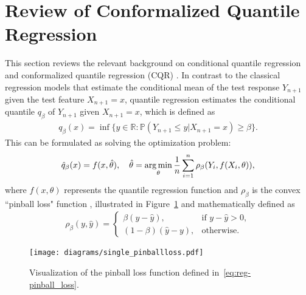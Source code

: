 \section{Review of Conformalized Quantile Regression}
\label{app:cqr_review}

This section reviews the relevant background on conditional quantile regression \cite{koenker1978quantreg} and conformalized quantile regression (CQR) \cite{romano2019conformalized}. 
In contrast to the classical regression models that estimate the conditional mean of the test response $Y_{n+1}$ given the test feature $X_{n+1} = x$, quantile regression estimates the conditional quantile $q_\beta$ of $Y_{n+1}$ given $X_{n+1} = x$, which is defined as
\begin{align} \label{eq:reg-cond_quantile}
    q_\beta(x) = \inf\{ y\in \mathbb{R}: \mathbb{P}(Y_{n+1} \leq y |X_{n+1} = x) \geq \beta \}.
\end{align}
This can be formulated as solving the optimization problem: 
\begin{align} \label{eq:reg-quantile_reg}
    \hat{q}_\beta(x) = f(x,\hat{\theta}), \quad \hat{\theta} = \operatorname*{arg\,min}_{\theta}\frac{1}{n}\sum_{i=1}^n \rho_\beta(Y_i, f(X_i, \theta)),
\end{align}
where $f(x,\theta)$ represents the quantile regression function \cite{koenker1978quantreg} and $\rho_\beta$ is the convex ``pinball loss" function \cite{Steinwart2011pinball}, illustrated in Figure~\ref{fig:pinball_loss} and mathematically defined as
\begin{align} \label{eq:reg-pinball_loss}
    \rho_\beta(y, \hat{y}) = 
  \begin{cases}\beta(y - \hat{y}), & \text{if } y - \hat{y} >0, \\
    (1-\beta)(\hat{y} - y), & \text{otherwise}.
    \end{cases}
\end{align}

\begin{figure}[!htb]
    \centering
    \texttt{[image: diagrams/single\_pinballloss.pdf]}
    \caption{Visualization of the pinball loss function defined in~\eqref{eq:reg-pinball_loss}.}
    \label{fig:pinball_loss}%
\end{figure}

